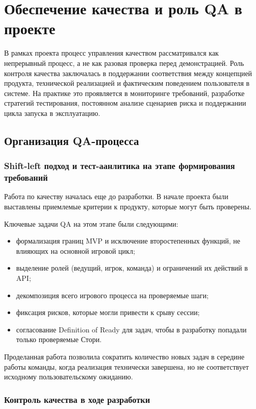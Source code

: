 \section{Обеспечение качества и роль QA в проекте}

В рамках проекта процесс управления качеством рассматривался как непрерывный процесс, а не как разовая проверка перед демонстрацией. Роль контроля качества заключалась в поддержании соответствия между концепцией продукта, технической реализацией и фактическим поведением пользователя в системе.  На практике это проявляется в мониторинге требований, разработке стратегий тестирования, постоянном анализе сценариев риска и поддержании цикла запуска в эксплуатацию.

\subsection{Организация QA-процесса}

\subsubsection{Shift-left подход и тест-аанлитика на этапе формирования требований}

Работа по качеству началась еще до разработки. В начале проекта были выставлены приемлемые критерии к продукту, которые могут быть проверены.

Ключевые задачи QA на этом этапе были следующими:

\begin{itemize}
    \item формализация границ MVP и исключение второстепенных функций, не влияющих на основной игровой цикл;
    \item выделение ролей (ведущий, игрок, команда) и ограничений их действий в API;
    \item декомпозиция всего игрового процесса на проверяемые шаги;
    \item фиксация рисков, которые могли привести к срыву сессии;
    \item согласование Definition of Ready для задач, чтобы в разработку попадали только проверяемые Стори.
\end{itemize}

Проделанная работа позволила сократить количество новых задач в середине работы команды, когда реализация технически завершена, но не соответствует исходному пользовательскому ожиданию.

\subsubsection{Контроль качества в ходе разработки}

